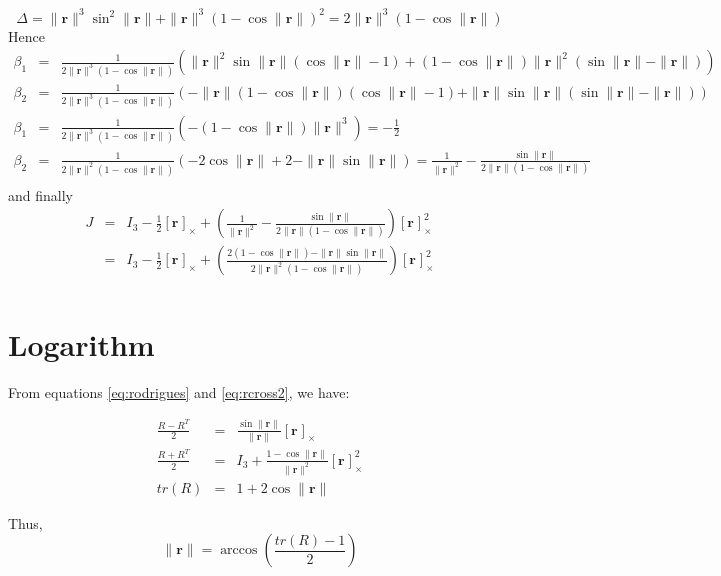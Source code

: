 \documentclass {article}
\newcommand\rot{\mathbf{r}}
\newcommand\rcross[1]{[\rot_{#1}]_{\times}}
\newcommand\normr{\|\rot\|}
\begin{document}
$$
\Delta = \normr^3\sin^2\normr + \normr^3 (1-\cos\normr)^2 = 2\normr^3(1 -\cos\normr)
$$
Hence
\begin{eqnarray*}
\beta_1 &=& \frac{1}{2\normr^3(1 -\cos\normr)}\left(\normr^2\sin\normr (\cos \normr - 1) + (1 - \cos \normr)\normr^2(\sin\normr - \normr)\right) \\
\beta_2 &=& \frac{1}{2\normr^3(1 -\cos\normr)}\left(-\normr(1 - \cos \normr)(\cos \normr - 1) + \normr\sin\normr(\sin\normr - \normr)\right)\\
\beta_1 &=& \frac{1}{2\normr^3(1 -\cos\normr)}\left(-(1 - \cos \normr)\normr^3\right) = -\frac{1}{2}\\
\beta_2 &=& \frac{1}{2\normr^2(1 -\cos\normr)}\left(-2\cos \normr + 2 - \normr\sin\normr\right) = \frac{1}{\normr^2} - \frac{\sin\normr}{2\normr(1-\cos\normr)}\\
\end{eqnarray*}
and finally
\begin{eqnarray*}
J &=& I_3 -\frac{1}{2}\rcross{} +  \left(\frac{1}{\normr^2} - \frac{\sin\normr}{2\normr(1-\cos\normr)}\right)\rcross{}^2\\
&=& I_3 -\frac{1}{2}\rcross{} +  \left(\frac{2(1-\cos\normr) - \normr\sin\normr}{2\normr^2(1-\cos\normr)}\right)\rcross{}^2\\
\end{eqnarray*}

\section{Logarithm}

From equations \ref{eq:rodrigues} and \ref{eq:rcross2}, we have:

\begin{eqnarray}
\label{eq:antisymmetric}
\frac{R - R^T}{2} &=& \frac{\sin \normr}{\normr}\rcross{} \\
\label{eq:symmetric}
\frac{R + R^T}{2} &=& I_3 + \frac{1 - \cos \normr}{\normr^2}\rcross{}^2 \\
\label{eq:trace}
tr(R) &=& 1 + 2 \cos \normr
\end{eqnarray}

Thus,
\begin{equation}
\normr = \arccos \left( \frac{tr(R) - 1}{2} \right)
\end{equation}
\end{document}
